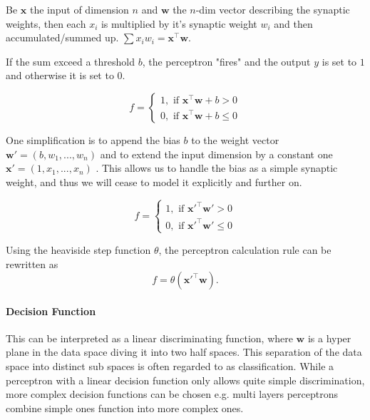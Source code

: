 Be $\textbf{x}$ the input of dimension $n$ and $\textbf{w}$ the $n$-dim vector describing the synaptic weights, then each $x_i$ is multiplied by it's synaptic weight $w_i$ and then accumulated/summed up.
$\sum x_i w_i = \textbf{x}^\intercal \textbf{w}$.

If the sum exceed a threshold $b$, the perceptron "fires" and the output $y$ is set to $1$ and otherwise it is set to $0$.

\[
	f = 
		\begin{cases}
			1, \text{  if  } \textbf{x}^\intercal \textbf{w} + b > 0  \\
			0, \text{  if  } \textbf{x}^\intercal \textbf{w} + b \le 0
		\end{cases}	
\]

One simplification is to append the bias $b$ to the weight vector $\textbf{w}' = (b , w_1, ... , w_n)$ and to extend the input dimension by a constant one $\textbf{x}' = (1, x_1 , ... , x_n)$ .
This allows us to handle the bias as a simple synaptic weight, and thus we will cease to  model it explicitly and further on.

\[
	f = 
		\begin{cases}
			1, \text{  if  } \textbf{x}'^\intercal \textbf{w}'> 0  \\
			0, \text{  if  } \textbf{x}'^\intercal \textbf{w}' \le 0
		\end{cases}	
\]



Using the heaviside step function $\theta$, the perceptron calculation rule can be rewritten as 
\[
	f = \theta(\textbf{x}'^\intercal \textbf{w}) .
\]   

\paragraph{Decision Function}

This can be interpreted as a linear discriminating function, where $\textbf{w}$ is a hyper plane in the data space diving it into two half spaces. This separation of the data space into distinct sub spaces is often regarded to as classification. While a perceptron with a linear decision function only allows quite simple discrimination, more complex decision functions can be chosen e.g. multi layers perceptrons combine simple ones function into more complex ones. 

